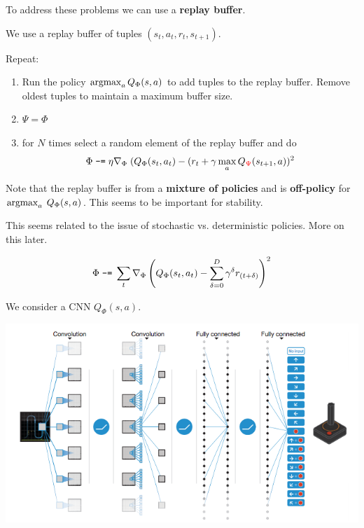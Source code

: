 {\vfill
To address these problems we can use a {\bf replay buffer}.


We use a replay buffer of tuples $(s_t,a_t,r_t,s_{t+1})$.

\vfill
Repeat:

\vfill
\begin{enumerate}

\item Run the policy $\operatorname*{argmax}_a Q_\Phi(s,a)$ to add tuples to the replay buffer.  Remove oldest tuples to maintain a maximum buffer size.

\item {\color{red} $\Psi = \Phi$}
  
\item for $N$ times select a random element of the replay buffer and do
$$\Phi \;\mbox{\tt -=} \; \eta \nabla_\Phi\;(Q_\Phi(s_t,a_t) - (r_t + \gamma \max_{a} Q_{\color{red} \Psi}(s_{t+1},a))^2$$
\end{enumerate}


Note that the replay buffer is from a {\bf mixture of policies} and is {\bf off-policy} for $\operatorname*{argmax}_a\;Q_\Phi(s,a)$.  This seems to be important for stability.

\vfill
This seems related to the issue of stochastic vs. deterministic policies.  More on this later.


$$\Phi \;\mbox{\tt -=} \;\sum_t \nabla_\Phi \left(Q_\Phi(s_t,a_t) - \sum_{\delta = 0}^{D} \gamma^\delta r_{(t+\delta)}\right)^2$$


\vfill
We consider a CNN $Q_\Phi(s,a)$.

\vfill
\centerline{\includegraphics[width=6in]{../images/DQN}}

}
